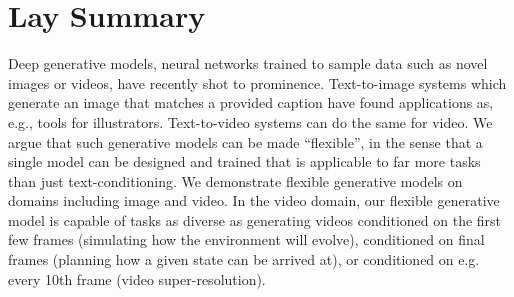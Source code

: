 

\chapter{Lay Summary}

Deep generative models, neural networks trained to sample data such as novel images or videos, have recently shot to prominence. Text-to-image systems which generate an image that matches a provided caption have found applications as, e.g., tools for illustrators. Text-to-video systems can do the same for video. We argue that such generative models can be made ``flexible'', in the sense that a single model can be designed and trained that is applicable to far more tasks than just text-conditioning. We demonstrate flexible generative models on domains including image and video. In the video domain, our flexible generative model is capable of tasks as diverse as generating videos conditioned on the first few frames (simulating how the environment will evolve), conditioned on final frames (planning how a given state can be arrived at), or conditioned on e.g. every 10th frame (video super-resolution).



\endinput

